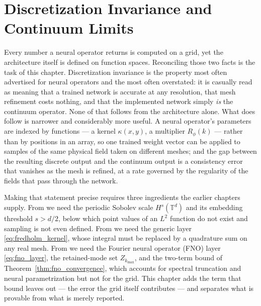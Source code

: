 
\chapter{Discretization Invariance and Continuum Limits}
\label{ch:part1-discretization-invariance-and-continuum-li}
\label{sec:discretization}

Every number a neural operator returns is computed on a grid, yet the
architecture itself is defined on function spaces.
Reconciling those two facts is the task of this chapter. Discretization
invariance is the property most often advertised for neural operators and the
most often overstated: it is casually read as meaning that a trained network is
accurate at any resolution, that mesh refinement costs nothing, and that the
implemented network simply \emph{is} the continuum operator. None of that
follows from the architecture alone. What does follow is narrower and
considerably more useful. A neural operator's parameters are indexed by
functions --- a kernel $\kappa(x,y)$, a multiplier $R_\phi(k)$
--- rather than by positions in an array, so one trained weight vector can be applied to
samples of the same physical field taken on different meshes; and the gap
between the resulting discrete output and the continuum output is a consistency
error that vanishes as the mesh is refined, at a rate governed by the regularity
of the fields that pass through the network.

Making that statement precise requires three ingredients the earlier chapters
supply. From  we
need the periodic Sobolev scale $H^s(\mathbb{T}^d)$ and its embedding threshold
$s>d/2$, below which point values of an $L^2$ function do not exist and sampling
is not even defined. From
 we need the
generic layer \eqref{eq:fredholm_kernel}, whose integral must be replaced by a
quadrature sum on any real mesh. From
 we need the
Fourier neural operator (FNO) layer \eqref{eq:fno_layer}, the retained-mode set
$Z_{k_{\max}}$, and the
two-term bound of Theorem~\ref{thm:fno_convergence}, which accounts for spectral
truncation and neural parametrization but not for the grid. This chapter adds the
term that bound leaves out --- the error the grid itself contributes --- and
separates what is provable from what is merely
reported.

